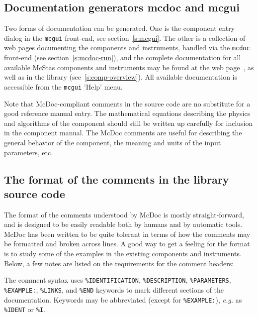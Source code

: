 \subsection{Documentation generators mcdoc and mcgui}

Two forms of documentation can be generated. One
is the component entry dialog in the \verb+mcgui+ front-end, see
section~\ref{s:mcgui}. The other is a collection of web pages documenting
the components and instruments, handled via the \verb+mcdoc+ front-end (see section~\ref{s:mcdoc-run}), and the complete documentation for all available
McStas components and instruments may be found at the \MCS
web page~\cite{mcstas_webpage}, as well as in the \MCS library
(see~\ref{s:comp-overview}). All available \MCS documentation is accessible from the \verb+mcgui+ 'Help' menu.

Note that McDoc-compliant comments in the source code are no substitute
for a good reference manual entry. The mathematical equations describing
the physics and algorithms of the component should still be written up
carefully for inclusion in the component manual. The McDoc comments are
useful for describing the general behavior of the component, the
meaning and units of the input parameters, etc.


\subsection{The format of the comments in the library source code}

The format of the comments understood by McDoc is mostly
straight-forward, and is designed to be easily readable both by humans
and by automatic tools. McDoc has been written to be quite tolerant in
terms of how the comments may be formatted and broken across lines. A
good way to get a feeling for the format is to study some of the examples
in the existing components and instruments. Below, a few
notes are listed on the requirements for the comment headers:

The comment syntax uses \verb+%IDENTIFICATION+, \verb+%DESCRIPTION+,
\verb+%PARAMETERS+, \verb+%EXAMPLE:+, \verb+%LINKS+, and \verb+%END+
keywords to mark different sections of the documentation. Keywords may
be abbreviated (except for \verb+%EXAMPLE:+), \textit{e.g.} as \verb+%IDENT+ or \verb+%I+.

